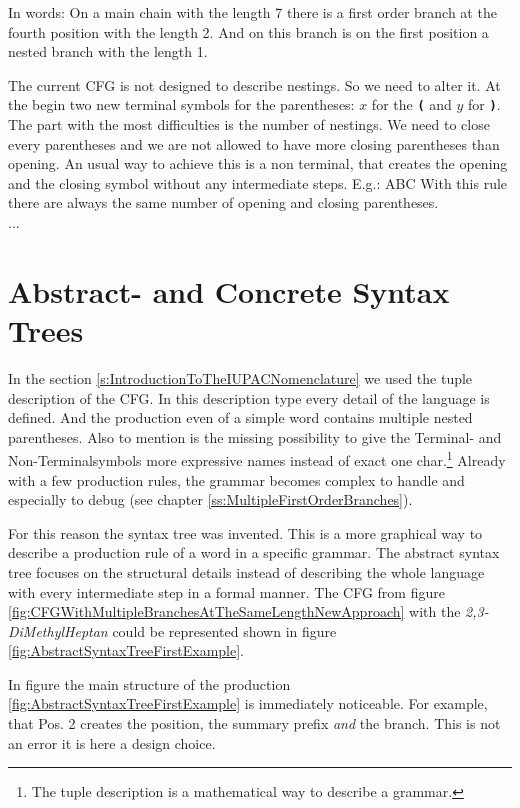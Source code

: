 \documentclass[a4paper,10pt]{article}
\newcommand{\gerquot}[1]{\glqq#1\grqq}
\newcommand{\dashAndSpace}{\textendash \space}
\newcommand{\nonterminal}{non terminal}
\begin{document}
In words: On a main chain with the length 7 \dashAndSpace there is a first order branch at the fourth position with the length 2. And on this branch is on the first position a nested branch with the length 1.

The current CFG is not designed to describe nestings. So we need to alter it. At the begin two new terminal symbols for the parentheses: $x$ for the \texttt{\textbf{(}} and $y$ for \texttt{\textbf{)}}. The part with the most difficulties is the number of nestings. We need to close every parentheses and we are not allowed to have more closing parentheses than opening. An usual way to achieve this is a \nonterminal, that creates the opening and the closing symbol \dashAndSpace without any intermediate steps. E.g.: A{\color{red}{x}}B{\color{red}{y}}C With this rule there are always the same number of opening and closing parentheses.\\


\noindent...



\section{Abstract- and Concrete Syntax Trees}\label{s:AbstractAndConcreteSyntaxTrees}
In the section \ref{s:IntroductionToTheIUPACNomenclature} we used the tuple description of the CFG. In this description type every detail of the language is defined. And the production even of a simple word contains multiple nested parentheses. Also to mention is the missing possibility to give the Terminal- and Non-Terminalsymbols more expressive names instead of exact one char.\footnote{The tuple description is a mathematical way to describe a grammar.} Already with a few production rules, the grammar becomes complex to handle and especially to debug (see chapter \ref{ss:MultipleFirstOrderBranches}).

For this reason the syntax tree was invented. This is a more graphical way to describe a production rule of a word in a specific grammar. The abstract syntax tree focuses on the structural details instead of describing the whole language with every intermediate step in a formal manner. The CFG from figure \ref{fig:CFGWithMultipleBranchesAtTheSameLengthNewApproach} with the \emph{2,3-DiMethylHeptan} could be represented shown in figure \ref{fig:AbstractSyntaxTreeFirstExample}.

In figure the main structure of the production \ref{fig:AbstractSyntaxTreeFirstExample} is immediately noticeable. For example, that \gerquot{Pos. 2} creates the position, the summary prefix \emph{and} the branch. This is not an error \dashAndSpace it is here a design choice.
\end{document}
